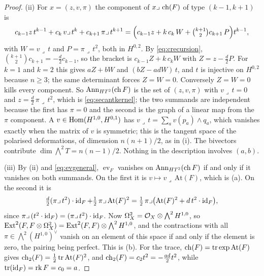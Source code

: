 \begin{proof}
(ii) For $x=(z,v,\pi)$ the component of $x\lrcorner\,\operatorname{ch}(F)$ of type
$(k-1,k+1)$ is
\[
  c_{k-1}z\,t^{k-1}+c_{k}\,v\lrcorner\,t^{k}+c_{k+1}\,\pi\lrcorner\,t^{k+1}
  =\Bigl(c_{k-1}z+k\,c_{k}\,W+\tbinom{k+1}{2}c_{k+1}\,P\Bigr)t^{k-1},
\]
with $W=v\lrcorner\,t$ and $P=\pi\lrcorner\,t^{2}$, both in $H^{0,2}$. By
\eqref{eq:crecursion}, $\binom{k+1}{2}c_{k+1}=-\tfrac d2c_{k-1}$, so the bracket
is $c_{k-1}Z+k\,c_{k}W$ with $Z=z-\tfrac d2P$. For $k=1$ and $k=2$ this gives
$aZ+bW$ and $(bZ-adW)\,t$, and $t$ is injective on $H^{0,2}$ because $n\ge3$;
the same determinant forces $Z=W=0$. Conversely $Z=W=0$ kills every
component. So $\operatorname{Ann}_{HT^{2}}(\operatorname{ch} F)$ is the set of $(z,v,\pi)$ with
$v\lrcorner\,t=0$ and $z=\tfrac d2\,\pi\lrcorner\,t^{2}$, which is
\eqref{eq:secantkernel}; the two summands are independent because the first
has $\pi=0$ and the second is the graph of a linear map from the $\pi$
component. A $v\in\operatorname{Hom}(H^{1,0},H^{0,1})$ has $v\lrcorner\,t=\sum_{a}v(p_{a})\wedge q_{a}$,
which vanishes exactly when the matrix of $v$ is symmetric; this is the
tangent space of the polarised deformations, of dimension $n(n+1)/2$, as in
(i). The bivectors contribute
$\dim\bigwedge^{2}T=n(n-1)/2$. Nothing in the description involves $(a,b)$.

(iii) By (ii) and \eqref{eq:evgeneral}, $\operatorname{ev}_{F}$ vanishes on
$\operatorname{Ann}_{HT^{2}}(\operatorname{ch} F)$ if and only if it vanishes on both summands. On the
first it is $v\mapsto v\lrcorner\,\mathrm{At}(F)$, which is (a). On the
second it is
\[
  \tfrac d2(\pi\lrcorner\,t^{2})\cdot\operatorname{id}_{F}+\tfrac12\,\pi\lrcorner\,\mathrm{At}(F)^{2}
  =\tfrac12\,\pi\lrcorner\bigl(\mathrm{At}(F)^{2}+d\,t^{2}\cdot\operatorname{id}_{F}\bigr),
\]
since $\pi\lrcorner\,(t^{2}\cdot\operatorname{id}_{F})=(\pi\lrcorner\,t^{2})\cdot\operatorname{id}_{F}$.
Now $\Omega^{2}_{X}=\mathcal{O}_{X}\otimes\bigwedge^{2}H^{1,0}$, so
$\operatorname{Ext}^{2}(F,F\otimes\Omega^{2}_{X})=\operatorname{Ext}^{2}(F,F)\otimes\bigwedge^{2}H^{1,0}$,
and the contractions with all $\pi\in\bigwedge^{2}(H^{1,0})^{\vee}$ vanish on
an element of this space if and only if the element is zero, the pairing
being perfect. This is (b). For the trace, $\operatorname{ch}(F)=\operatorname{tr}\exp\mathrm{At}(F)$
gives $\operatorname{ch}_{2}(F)=\tfrac12\operatorname{tr}\mathrm{At}(F)^{2}$, and
$\operatorname{ch}_{2}(F)=c_{2}t^{2}=-\tfrac{ad}{2}t^{2}$, while
$\operatorname{tr}(\operatorname{id}_{F})=\operatorname{rk} F=c_{0}=a$.


\end{proof}
